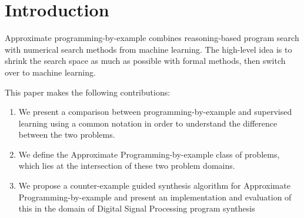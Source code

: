 
\section{Introduction}

Approximate programming-by-example combines reasoning-based program search with numerical search methods from machine learning.
The high-level idea is to shrink the search space as much as possible with formal methods, then switch over to machine learning.


This paper makes the following contributions:

\begin{enumerate}
\item We present a comparison between programming-by-example and supervised learning using a common notation in order to understand the difference between the two problems.
\item We define the Approximate Programming-by-example class of problems, which lies at the intersection of these two problem domains.
\item We propose a counter-example guided synthesis algorithm for Approximate Programming-by-example and present an implementation and evaluation of this in the domain of Digital Signal Processing program synthesis 
\end{enumerate}
